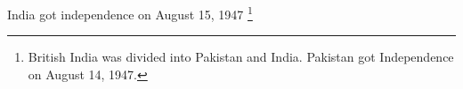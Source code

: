 \documentclass{article}
\begin{document}
India got independence on August 15, 1947 \footnote{\label{area-separation} British India was divided into Pakistan and India. Pakistan got Independence on August 14, 1947.}
\end{document}
